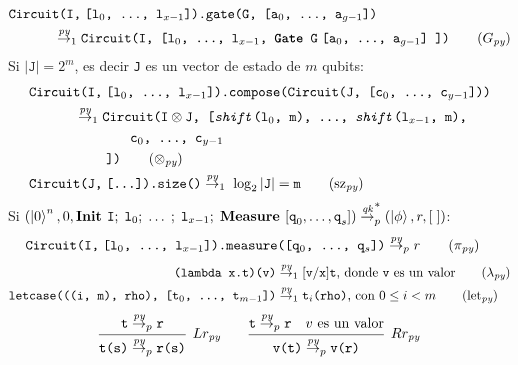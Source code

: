 \begin{definicion}
\label{def:reduccion_python}
\begin{align*}
    \texttt{Circuit(I,}&\;\texttt{[l$_0$, \dots, l$_{x-1}$]).gate(G, [a$_0$, \dots, a$_{g-1}$])}\\
    \redpy_1\;& \texttt{Circuit(I, [l$_0$, \dots, l$_{x-1}$, \textbf{Gate} G\;[a$_0$, \dots, a$_{g-1}$] ])} \tag{$G_\textit{py}$}
\end{align*}
Si $|\texttt{J}| = 2^m$, es decir \texttt{J} es un vector de estado de $m$ qubits:
\begin{align*}
    \texttt{Circuit(I,}&\;\texttt{[l$_0$, \dots, l$_{x-1}$]).compose(Circuit(J, [c$_0$, \dots, c$_{y-1}$]))} \\
    \redpy_1\;& \texttt{Circuit(I}\otimes\texttt{J, [\textit{shift}(l$_0$, m), \dots, \textit{shift}(l$_{x-1}$, m),} \\
    &\qquad \texttt{c$_0$, \dots, c$_{y-1}$}\\
    &\;\texttt{])}  \tag{$\otimes_\textit{py}$}\\
    \texttt{Circuit(J,}&\;\texttt{[\dots]).size()} \redpy_1\; \log_2|\texttt{J}| = \texttt{m} \tag{\text{sz}$_\textit{py}$}
\end{align*} 
Si $(\ket{0}^n, 0, \textbf{Init }\texttt{I};\;\texttt{l}_0;\;\dots\;;\;\texttt{l}_{x-1};\;\textbf{Measure } [\texttt{q}_0, \dots, \texttt{q}_s]) \overset{\textit{qk}}{\rightarrow}_p^* (\ket{\phi}, r, [\;])$: \footnotemark
\begin{align*}
    \texttt{Circuit(I,}&\;\texttt{[l$_0$, \dots, l$_{x-1}$]).measure([q$_0$, \dots, q$_s$])} \redpy_p \texttt{$r$}  \tag{$\pi_\textit{py}$}
\end{align*}
\vspace{-1.5\baselineskip}
\begin{align*}
    \texttt{(lambda x.t)(v)} \redpy_1&\; [ \texttt{v}/\texttt{x}]\texttt{t}\text{, donde } \texttt{v} \text{ es un valor} \tag{$\lambda_\textit{py}$}\\
    \texttt{letcase(((i, m), rho), [t$_0$, \dots, t$_{m-1}$])} \redpy_1&\; \texttt{t$_i$(rho)}\text{, con }0\leq i < m \tag{\text{let}$_\textit{py}$}
\end{align*}
 \[\arraycolsep=10pt\def\arraystretch{2.6}
   \begin{array}{cc}
     \infer[Lr_\textit{py}]
     {\texttt{t(s)} \redpy_p \texttt{r(s)}}
     {\texttt{t} \redpy_p \texttt{r}}
     &
     \infer[Rr_\textit{py}]
     {\texttt{v(t)} \redpy_p \texttt{v(r)}}
     {\texttt{t} \redpy_p \texttt{r} \quad v\text{ es un valor}}

\end{array}\]
\end{definicion}
